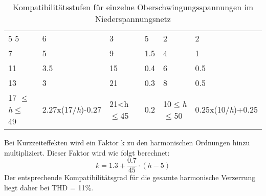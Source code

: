 \begin{table}[ht!]
{\begin{tabular}{|l|l|l|l|l|l|}
			5
			5                                                         & 6                                                     & 3                                                       & 5                                                & 2                                           & 2                                         \\
			7                                                         & 5                                                     & 9                                                       & 1.5                                              & 4                                           & 1                                         \\
			11                                                        & 3.5                                                   & 15                                                      & 0.4                                              & 6                                           & 0.5                                       \\
			13                                                        & 3                                                     & 21                                                      & 0.3                                              & 8                                           & 0.5                                       \\
			17 $\leq$\textit{h}$\leq$ 49                                                   & 2.27x(17/\textit{h})-0.27                                   & 21<h$\leq$45                                                 & 0.2                                              & 10$\leq$\textit{h}$\leq$50                                     & 0.25x(10/\textit{h})+0.25                       \\ \hline
	\end{tabular}}
	\caption{Kompatibilitätsstufen für einzelne Oberschwingungsspannungen im Niederspannungsnetz}\label{Test1}
\end{table}

Bei Kurzzeiteffekten wird ein Faktor k zu den harmonischen Ordnungen hinzu multipliziert. Dieser Faktor wird wie folgt berechnet: 
\begin{equation}\label{eq:factor_k_für_kurzzeiteffekte}
k = {1.3+\frac{0.7}{45}\cdot(h-5)}
\end{equation}
Der entsprechende Kompatibilitätsgrad für die gesamte harmonische Verzerrung liegt daher bei THD = 11\%.



